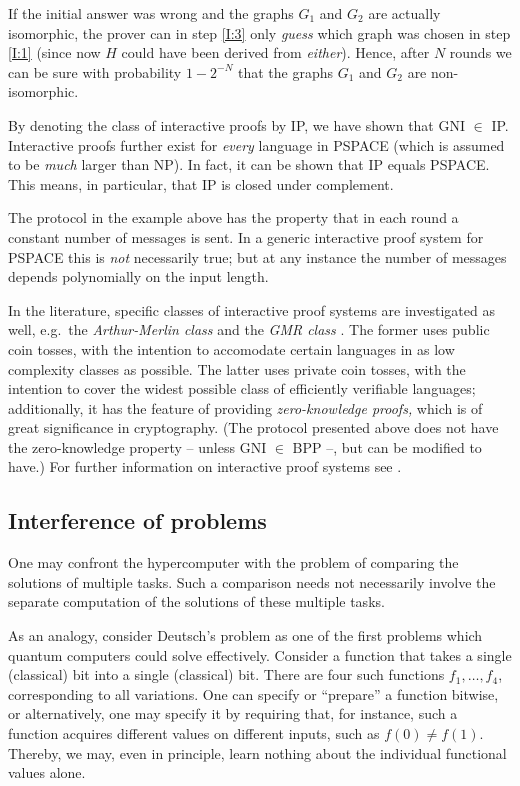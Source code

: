 \documentclass[12pt]{article}
\begin{document}
If the initial answer was wrong and the graphs $G_1$ and $G_2$ are actually isomorphic,
the prover can in step \ref{I:3} only \emph{guess} which graph
was chosen in step \ref{I:1} (since now $H$ could have been derived from
\emph{either}). Hence, after $N$ rounds we can be sure with probability
$1-2^{-N}$ that the graphs $G_1$ and $G_2$ are non-isomorphic.

By denoting the class of interactive proofs by IP, we have shown that
GNI $\in$ IP. Interactive proofs further exist for \emph{every} language in
PSPACE (which is assumed to be \emph{much} larger than NP). In fact, it can be shown
\cite{sha:92} that IP equals PSPACE. This means, in particular, that
IP is closed under complement.

The protocol in the example above has the property that in each round a constant number
of messages is sent. In a generic interactive proof system for
PSPACE this is \emph{not} necessarily true; but at any instance the number of messages depends
polynomially on the input length.

In the literature, specific classes of interactive proof systems are investigated
as well, e.g.\ the \emph{Arthur-Merlin class} \cite{bab:85} and
the \emph{GMR class} \cite{GMR:85}. The former uses public coin tosses, with the
intention to accomodate certain languages in as low complexity classes as possible.
The latter uses private coin tosses, with the intention to cover the widest
possible class of efficiently verifiable languages;
additionally, it has the feature of providing \emph{zero-knowledge proofs,}
which is of great significance in cryptography. (The protocol presented above does
not have the zero-knowledge property -- unless GNI $\in$ BPP --, but can be modified
to have.) For further information on interactive proof systems see \cite{BM:88,gold:01}.

\subsection{Interference of problems}

One may confront the hypercomputer with the problem
of comparing the solutions of multiple tasks.
Such a comparison needs not necessarily involve the separate computation of the solutions of these multiple tasks.

As an analogy, consider Deutsch's problem as one of the first problems which
quantum computers could solve effectively.
Consider a function that takes a single (classical) bit into a single (classical) bit.
There are four such functions $f_1,\ldots ,f_4$, corresponding to all variations.
One can specify or ``prepare'' a function bitwise, or alternatively,
one may specify it by requiring that, for instance, such a function
acquires different values on different inputs, such as $f(0)\neq f(1)$.
Thereby, we may, even in principle, learn nothing about the individual functional values alone.
\end{document}

